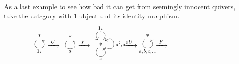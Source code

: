 \begin{example}\label{ex:U-F-U-F_from_singleton}\\

As a last example to see how bad it can get from seemingly innocent quivers, take the category with 1 object and its identity morphism:
\[
\noindent\begin{minipage}{.005\textwidth}
\phantom{}
\end{minipage}
\begin{minipage}{.08\textwidth}
\begin{tikzcd}
\ast \arrow["1_{\ast}"', loop, distance=2em, in=305, out=235]
\end{tikzcd}
\end{minipage}
%
\begin{minipage}{.05\textwidth}
$\xrightarrow{\text{     }U\text{     }}$
\end{minipage}
%
\begin{minipage}{.08\textwidth}
\begin{tikzcd}
\ast \arrow["a"', loop, distance=2em, in=305, out=235]
\end{tikzcd}
\end{minipage}
%
\begin{minipage}{.05\textwidth}
$\xrightarrow{\text{     }F\text{     }}$
\end{minipage}
%
\begin{minipage}{.15\textwidth}
\begin{tikzcd}
\ast \arrow["a"', loop, distance=2em, in=305, out=235] \arrow["1_{\ast}"', loop, distance=2em, in=125, out=55] \arrow["{a^{2}, a^{3},\dots}"', loop, distance=2em, in=35, out=325]
\end{tikzcd}
\end{minipage}
%
\begin{minipage}{.05\textwidth}
$\xrightarrow{\text{     }U\text{     }}$
\end{minipage}
%
\begin{minipage}{.08\textwidth}
\begin{tikzcd}
\ast \arrow["{a, b, c,\dots}"', loop, distance=2em, in=305, out=235]
\end{tikzcd}
\end{minipage}
%
\begin{minipage}{.05\textwidth}
$\xrightarrow{\text{     }F\text{     }}$
\end{minipage}
%
\begin{minipage}{.25\textwidth}
\begin{tikzcd}

\end{tikzcd}
\end{minipage}\]
\end{example}
